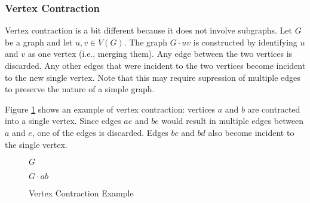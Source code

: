 \subsubsection{Vertex Contraction}

Vertex contraction is a bit different because it does not involve subgraphs.  Let \(G\) be a graph and let \(u,v\in
V(G)\).  The graph \(G\cdot uv\) is constructed by identifying \(u\) and \(v\) as one vertex (i.e., merging them).
Any edge between the two vertices is discarded.  Any other edges that were incident to the two vertices become
incident to the new single vertex.  Note that this may require supression of multiple edges to preserve the nature
of a simple graph.

Figure \ref{fig:contract} shows an example of vertex contraction: vertices \(a\) and \(b\) are contracted into a
single vertex.  Since edges \(ae\) and \(be\) would result in multiple edges between \(a\) and \(e\), one of the
edges is discarded.  Edges \(bc\) and \(bd\) also become incident to the single vertex.

\begin{figure}[h]
  \label{fig:contract}
  \begin{minipage}{3in}
    \begin{center}

      \bigskip

      \(G\)
    \end{center}
  \end{minipage}
  \begin{minipage}{3in}
    \begin{center} 

      \bigskip

      \(G\cdot ab\)
    \end{center}
  \end{minipage}
  \caption{Vertex Contraction Example}
\end{figure}

